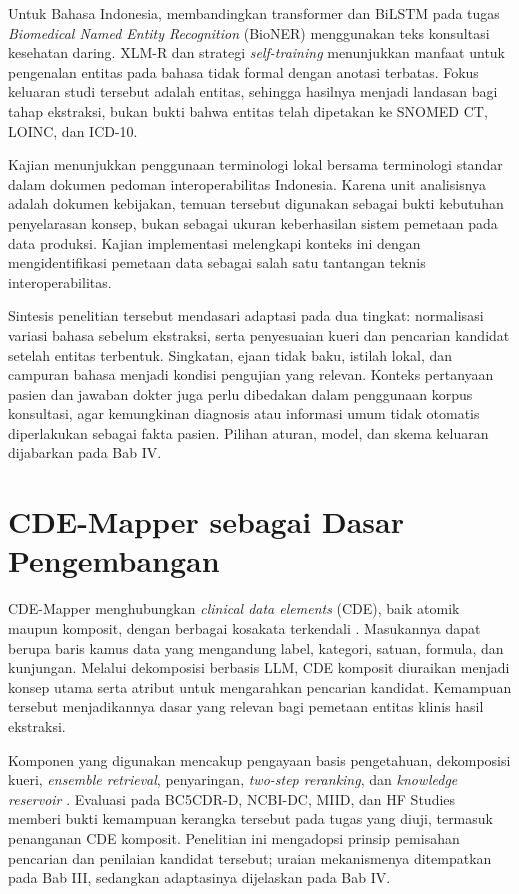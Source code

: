 Untuk Bahasa Indonesia, \citet{purwitasari_comparison_2023} membandingkan transformer dan BiLSTM pada tugas \textit{Biomedical Named Entity Recognition} (BioNER) menggunakan teks konsultasi kesehatan daring. XLM-R dan strategi \textit{self-training} menunjukkan manfaat untuk pengenalan entitas pada bahasa tidak formal dengan anotasi terbatas. Fokus keluaran studi tersebut adalah entitas, sehingga hasilnya menjadi landasan bagi tahap ekstraksi, bukan bukti bahwa entitas telah dipetakan ke SNOMED CT, LOINC, dan ICD-10.

Kajian \citet{ayuningtyas_bringing_2025} menunjukkan penggunaan terminologi lokal bersama terminologi standar dalam dokumen pedoman interoperabilitas Indonesia. Karena unit analisisnya adalah dokumen kebijakan, temuan tersebut digunakan sebagai bukti kebutuhan penyelarasan konsep, bukan sebagai ukuran keberhasilan sistem pemetaan pada data produksi. Kajian implementasi \citet{heryawan_fast_2025} melengkapi konteks ini dengan mengidentifikasi pemetaan data sebagai salah satu tantangan teknis interoperabilitas.

Sintesis penelitian tersebut mendasari adaptasi pada dua tingkat: normalisasi variasi bahasa sebelum ekstraksi, serta penyesuaian kueri dan pencarian kandidat setelah entitas terbentuk. Singkatan, ejaan tidak baku, istilah lokal, dan campuran bahasa menjadi kondisi pengujian yang relevan. Konteks pertanyaan pasien dan jawaban dokter juga perlu dibedakan dalam penggunaan korpus konsultasi, agar kemungkinan diagnosis atau informasi umum tidak otomatis diperlakukan sebagai fakta pasien. Pilihan aturan, model, dan skema keluaran dijabarkan pada Bab IV.

\section{CDE-Mapper sebagai Dasar Pengembangan}
\label{sec:tinjauan-cde-mapper}

CDE-Mapper menghubungkan \textit{clinical data elements} (CDE), baik atomik maupun komposit, dengan berbagai kosakata terkendali \citep{gilani_cde-mapper_2025}. Masukannya dapat berupa baris kamus data yang mengandung label, kategori, satuan, formula, dan kunjungan. Melalui dekomposisi berbasis LLM, CDE komposit diuraikan menjadi konsep utama serta atribut untuk mengarahkan pencarian kandidat. Kemampuan tersebut menjadikannya dasar yang relevan bagi pemetaan entitas klinis hasil ekstraksi.

Komponen yang digunakan mencakup pengayaan basis pengetahuan, dekomposisi kueri, \textit{ensemble retrieval}, penyaringan, \textit{two-step reranking}, dan \textit{knowledge reservoir} \citep{gilani_cde-mapper_2025}. Evaluasi pada BC5CDR-D, NCBI-DC, MIID, dan HF Studies memberi bukti kemampuan kerangka tersebut pada tugas yang diuji, termasuk penanganan CDE komposit. Penelitian ini mengadopsi prinsip pemisahan pencarian dan penilaian kandidat tersebut; uraian mekanismenya ditempatkan pada Bab III, sedangkan adaptasinya dijelaskan pada Bab IV.


